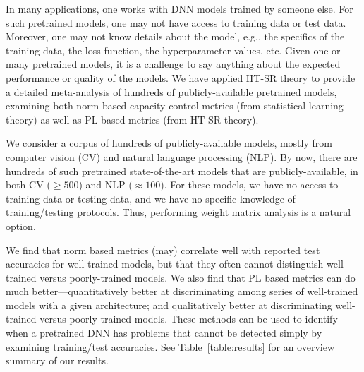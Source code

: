 \documentclass{article}
\begin{document}

In many applications, one works with DNN models trained by someone else.
For such pretrained models, one may not have access to training data or test data.
Moreover, one may not know details about the model, e.g., the specifics of the training data, the loss function, the hyperparameter values, etc.
Given one or many pretrained models, it is a challenge to say anything about the expected performance or quality of the models.
We have applied HT-SR theory to provide a detailed meta-analysis of hundreds of publicly-available pretrained models, examining both norm based capacity control metrics (from statistical learning theory) as well as PL based metrics (from HT-SR theory).

We consider a corpus of hundreds of publicly-available models, mostly from computer vision (CV) and natural language processing (NLP).
By now, there are 
hundreds of such pretrained 
state-of-the-art models that are publicly-available, 
in both CV ($\ge 500$) and NLP ($\approx 100$).
For these models, we have no access to training data or testing data, and we have no specific knowledge of training/testing protocols. 
Thus, performing weight matrix analysis is a natural option.


We find that norm based metrics (may) correlate well with reported test accuracies for well-trained models, 
but that they often cannot distinguish well-trained versus poorly-trained models.
We also find that PL based metrics can do much better---quantitatively better at discriminating among series of well-trained models with a given architecture; and qualitatively better at discriminating well-trained versus poorly-trained models.
These methods can be used to identify when a pretrained DNN has problems that cannot be detected simply by examining training/test accuracies.
%
See Table~\ref{table:results} for an overview summary of our results.
\end{document}
